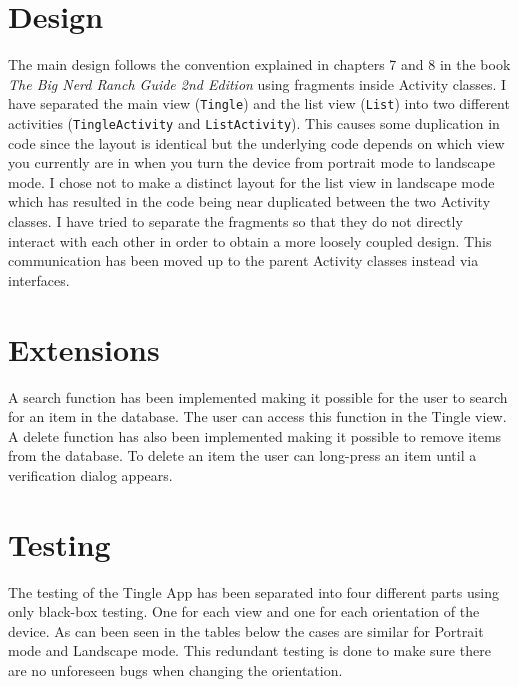 \section{Design}
The main design follows the convention explained in chapters 7 and 8 in the book \emph{The Big Nerd Ranch Guide 2nd Edition} using fragments inside Activity classes.
I have separated the main view (\texttt{Tingle}) and the list view (\texttt{List}) into two different activities 
(\texttt{TingleActivity} and \texttt{ListActivity}). This causes some duplication in code since the layout is identical 
but the underlying code depends on which view you currently are in when you turn the device 
from portrait mode to landscape mode. I chose not to make a distinct layout for the list view in 
landscape mode which has resulted in the code being near duplicated between the two Activity classes.
I have tried to separate the fragments so that they do not directly interact with each other in 
order to obtain a more loosely coupled design.
This communication has been moved up to the parent Activity classes instead via interfaces.

\section{Extensions }
A search function has been implemented making it possible for the user to search for an item in 
the database. The user can access this function in the Tingle view.
A delete function has also been implemented making it possible to remove items from the database. To delete an item the user can long-press an item until a verification dialog appears.

\section{Testing}
The testing of the Tingle App has been separated into four different parts using only black-box testing. One for each view and one for each orientation of the device. As can been seen in the tables below the cases are similar for Portrait mode and Landscape mode. This redundant testing is done to make sure there are no unforeseen bugs when changing the orientation.

